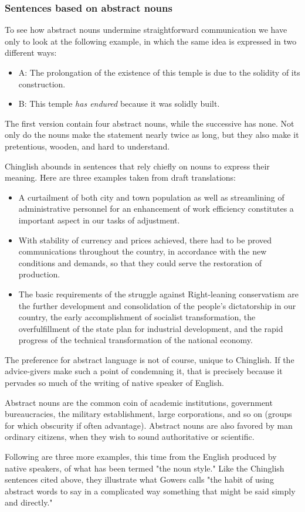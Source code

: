 \documentclass{article}
\begin{document}
\subsubsection{Sentences based on abstract nouns}
To see how abstract nouns undermine straightforward communication we have only to look at the following example, in which the same idea is expressed in two different ways:

\begin{itemize}
  \item A: The prolongation of the existence of this temple is due to the solidity of its construction.
  \item B: This temple \emph{has endured} because it was solidly built.
\end{itemize}

The first version contain four abstract nouns, while the successive has none. Not only do the nouns make the statement nearly twice as long, but they also make it pretentious, wooden, and hard to understand.

Chinglish abounds in sentences that rely chiefly on nouns to express their meaning. Here are three examples taken from draft translations:

\begin{itemize}
  \item A curtailment of both city and town population as well as streamlining of administrative personnel for an enhancement of work efficiency constitutes a important aspect in our tasks of adjustment.
  \item With stability of currency and prices achieved, there had to be proved communications throughout the country, in accordance with the new conditions and demands, so that they could serve the restoration of production.
  \item The basic requirements of the struggle against Right-leaning conservatism are the further development and consolidation of the people's dictatorship in our country, the early accomplishment of socialist transformation, the overfulfillment of the state plan for industrial development, and the rapid progress of the technical transformation of the national economy.
\end{itemize}

The preference for abstract language is not of course, unique to Chinglish. If the advice-givers make such a point of condemning it, that is precisely because it pervades so much of the writing of native speaker of English.

Abstract nouns are the common coin of academic institutions, government bureaucracies, the military establishment, large corporations, and so on (groups for which obscurity if often advantage). Abstract nouns are also favored by man ordinary citizens, when they wish to sound authoritative or scientific.

Following are three more examples, this time from the English produced by native speakers, of what has been termed "the noun style." Like the Chinglish sentences cited above, they illustrate what Gowers calls "the habit of using abstract words to say in a complicated way something that might be said simply and directly."
\end{document}

